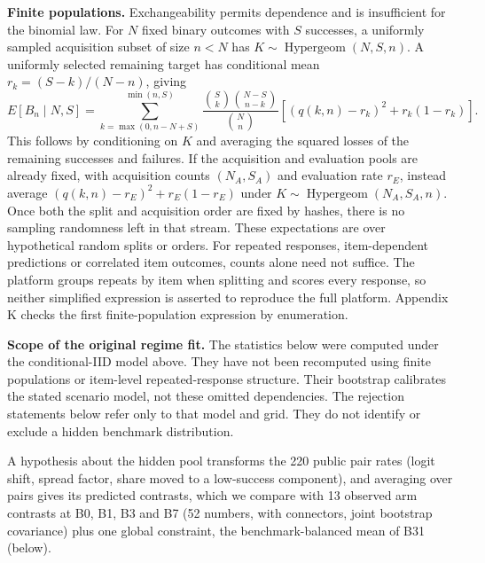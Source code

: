 \documentclass[
]{article}
\begin{document}
\textbf{Finite populations.} Exchangeability permits dependence and is
insufficient for the binomial law. For \(N\) fixed binary outcomes with
\(S\) successes, a uniformly sampled acquisition subset of size \(n<N\)
has \(K\sim\operatorname{Hypergeom}(N,S,n)\). A uniformly selected
remaining target has conditional mean \(r_k=(S-k)/(N-n)\), giving
\[E[B_n\mid N,S]=\sum_{k=\max(0,n-N+S)}^{\min(n,S)}
\frac{\binom{S}{k}\binom{N-S}{n-k}}{\binom{N}{n}}
\left[(q(k,n)-r_k)^2+r_k(1-r_k)\right].\] This follows by conditioning
on \(K\) and averaging the squared losses of the remaining successes and
failures. If the acquisition and evaluation pools are already fixed,
with acquisition counts \((N_A,S_A)\) and evaluation rate \(r_E\),
instead average \((q(k,n)-r_E)^2+r_E(1-r_E)\) under
\(K\sim\operatorname{Hypergeom}(N_A,S_A,n)\). Once both the split and
acquisition order are fixed by hashes, there is no sampling randomness
left in that stream. These expectations are over hypothetical random
splits or orders. For repeated responses, item-dependent predictions or
correlated item outcomes, counts alone need not suffice. The platform
groups repeats by item when splitting and scores every response, so
neither simplified expression is asserted to reproduce the full
platform. Appendix K checks the first finite-population expression by
enumeration.

\textbf{Scope of the original regime fit.} The statistics below were
computed under the conditional-IID model above. They have not been
recomputed using finite populations or item-level repeated-response
structure. Their bootstrap calibrates the stated scenario model, not
these omitted dependencies. The rejection statements below refer only to
that model and grid. They do not identify or exclude a hidden benchmark
distribution.

A hypothesis about the hidden pool transforms the 220 public pair rates
(logit shift, spread factor, share moved to a low-success component),
and averaging over pairs gives its predicted contrasts, which we compare
with 13 observed arm contrasts at B0, B1, B3 and B7 (52 numbers, with
connectors, joint bootstrap covariance) plus one global constraint, the
benchmark-balanced mean of B31 (below).
\end{document}

